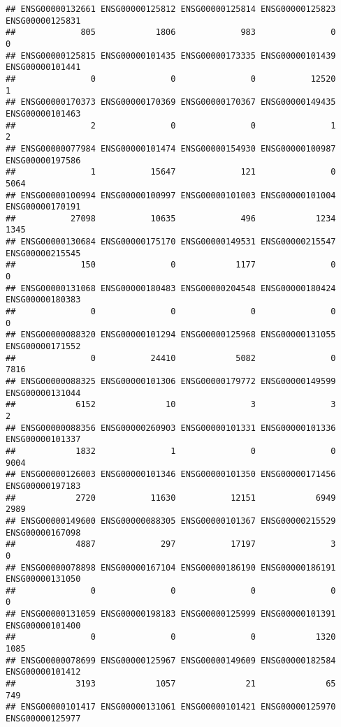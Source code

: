 \documentclass[
]{article}
\begin{document}
\begin{verbatim}
## ENSG00000132661 ENSG00000125812 ENSG00000125814 ENSG00000125823 ENSG00000125831 
##             805            1806             983               0               0 
## ENSG00000125815 ENSG00000101435 ENSG00000173335 ENSG00000101439 ENSG00000101441 
##               0               0               0           12520               1 
## ENSG00000170373 ENSG00000170369 ENSG00000170367 ENSG00000149435 ENSG00000101463 
##               2               0               0               1               2 
## ENSG00000077984 ENSG00000101474 ENSG00000154930 ENSG00000100987 ENSG00000197586 
##               1           15647             121               0            5064 
## ENSG00000100994 ENSG00000100997 ENSG00000101003 ENSG00000101004 ENSG00000170191 
##           27098           10635             496            1234            1345 
## ENSG00000130684 ENSG00000175170 ENSG00000149531 ENSG00000215547 ENSG00000215545 
##             150               0            1177               0               0 
## ENSG00000131068 ENSG00000180483 ENSG00000204548 ENSG00000180424 ENSG00000180383 
##               0               0               0               0               0 
## ENSG00000088320 ENSG00000101294 ENSG00000125968 ENSG00000131055 ENSG00000171552 
##               0           24410            5082               0            7816 
## ENSG00000088325 ENSG00000101306 ENSG00000179772 ENSG00000149599 ENSG00000131044 
##            6152              10               3               3               2 
## ENSG00000088356 ENSG00000260903 ENSG00000101331 ENSG00000101336 ENSG00000101337 
##            1832               1               0               0            9004 
## ENSG00000126003 ENSG00000101346 ENSG00000101350 ENSG00000171456 ENSG00000197183 
##            2720           11630           12151            6949            2989 
## ENSG00000149600 ENSG00000088305 ENSG00000101367 ENSG00000215529 ENSG00000167098 
##            4887             297           17197               3               0 
## ENSG00000078898 ENSG00000167104 ENSG00000186190 ENSG00000186191 ENSG00000131050 
##               0               0               0               0               0 
## ENSG00000131059 ENSG00000198183 ENSG00000125999 ENSG00000101391 ENSG00000101400 
##               0               0               0            1320            1085 
## ENSG00000078699 ENSG00000125967 ENSG00000149609 ENSG00000182584 ENSG00000101412 
##            3193            1057              21              65             749 
## ENSG00000101417 ENSG00000131061 ENSG00000101421 ENSG00000125970 ENSG00000125977 

\end{verbatim}
\end{document}
